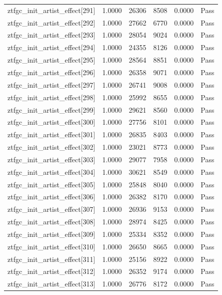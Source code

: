\begin{table}[htbp]
\begin{tabular}{llrrll}
ztfgc\_init\_artist\_effect[291] & 1.0000 & 26306 & 8508 & 0.0000 & Pass \\
ztfgc\_init\_artist\_effect[292] & 1.0000 & 27662 & 6770 & 0.0000 & Pass \\
ztfgc\_init\_artist\_effect[293] & 1.0000 & 28054 & 9024 & 0.0000 & Pass \\
ztfgc\_init\_artist\_effect[294] & 1.0000 & 24355 & 8126 & 0.0000 & Pass \\
ztfgc\_init\_artist\_effect[295] & 1.0000 & 28564 & 8851 & 0.0000 & Pass \\
ztfgc\_init\_artist\_effect[296] & 1.0000 & 26358 & 9071 & 0.0000 & Pass \\
ztfgc\_init\_artist\_effect[297] & 1.0000 & 26741 & 9008 & 0.0000 & Pass \\
ztfgc\_init\_artist\_effect[298] & 1.0000 & 25992 & 8655 & 0.0000 & Pass \\
ztfgc\_init\_artist\_effect[299] & 1.0000 & 29621 & 8560 & 0.0000 & Pass \\
ztfgc\_init\_artist\_effect[300] & 1.0000 & 27756 & 8101 & 0.0000 & Pass \\
ztfgc\_init\_artist\_effect[301] & 1.0000 & 26835 & 8403 & 0.0000 & Pass \\
ztfgc\_init\_artist\_effect[302] & 1.0000 & 23021 & 8773 & 0.0000 & Pass \\
ztfgc\_init\_artist\_effect[303] & 1.0000 & 29077 & 7958 & 0.0000 & Pass \\
ztfgc\_init\_artist\_effect[304] & 1.0000 & 30621 & 8549 & 0.0000 & Pass \\
ztfgc\_init\_artist\_effect[305] & 1.0000 & 25848 & 8040 & 0.0000 & Pass \\
ztfgc\_init\_artist\_effect[306] & 1.0000 & 26382 & 8170 & 0.0000 & Pass \\
ztfgc\_init\_artist\_effect[307] & 1.0000 & 26936 & 9153 & 0.0000 & Pass \\
ztfgc\_init\_artist\_effect[308] & 1.0000 & 28974 & 8425 & 0.0000 & Pass \\
ztfgc\_init\_artist\_effect[309] & 1.0000 & 25334 & 8352 & 0.0000 & Pass \\
ztfgc\_init\_artist\_effect[310] & 1.0000 & 26650 & 8665 & 0.0000 & Pass \\
ztfgc\_init\_artist\_effect[311] & 1.0000 & 25156 & 8922 & 0.0000 & Pass \\
ztfgc\_init\_artist\_effect[312] & 1.0000 & 26352 & 9174 & 0.0000 & Pass \\
ztfgc\_init\_artist\_effect[313] & 1.0000 & 26776 & 8172 & 0.0000 & Pass \\

\end{tabular}
\end{table}

